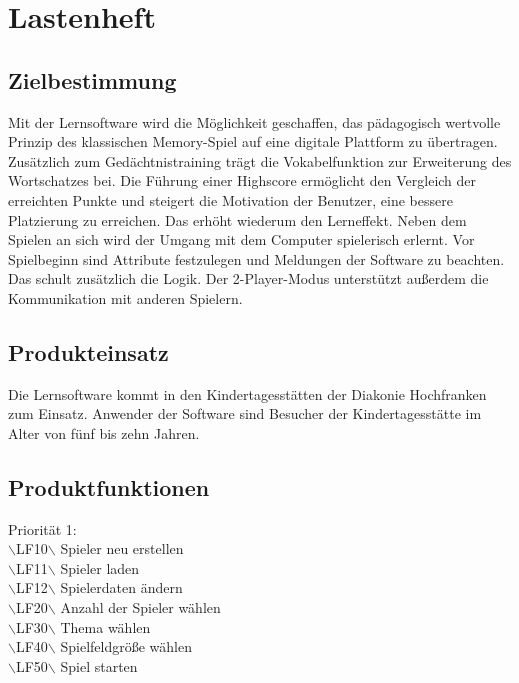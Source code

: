 \clearpage
\chapter{Lastenheft}

\section{Zielbestimmung} %
Mit der Lernsoftware wird die Möglichkeit geschaffen, das pädagogisch wertvolle Prinzip des klassischen Memory-Spiel auf eine digitale Plattform zu übertragen. Zusätzlich zum Gedächtnistraining trägt die Vokabelfunktion zur Erweiterung des Wortschatzes bei. Die Führung einer Highscore ermöglicht den Vergleich der erreichten Punkte und steigert die Motivation der Benutzer, eine bessere Platzierung zu erreichen. Das erhöht wiederum den Lerneffekt. Neben dem Spielen an sich wird der Umgang mit dem Computer spielerisch erlernt. Vor Spielbeginn sind Attribute festzulegen und Meldungen der Software zu beachten. Das schult zusätzlich die Logik. Der 2-Player-Modus unterstützt außerdem die Kommunikation mit anderen Spielern.


\section{Produkteinsatz} %
Die Lernsoftware kommt in den Kindertagesstätten der Diakonie Hochfranken zum Einsatz. Anwender der Software sind Besucher der Kindertagesstätte im Alter von fünf bis zehn Jahren.

\section{Produktfunktionen} %

\noindent Priorität 1:\\
\noindent$\backslash$LF10$\backslash$ \hspace{15 mm}Spieler neu erstellen \\
\noindent$\backslash$LF11$\backslash$ \hspace{15 mm}Spieler laden\\ %
\noindent$\backslash$LF12$\backslash$ \hspace{15 mm}Spielerdaten ändern\\  %
\noindent$\backslash$LF20$\backslash$ \hspace{15 mm}Anzahl der Spieler wählen\\
\noindent$\backslash$LF30$\backslash$ \hspace{15 mm}Thema wählen\\
\noindent$\backslash$LF40$\backslash$ \hspace{15 mm}Spielfeldgröße wählen\\
\noindent$\backslash$LF50$\backslash$ \hspace{15 mm}Spiel starten\\

